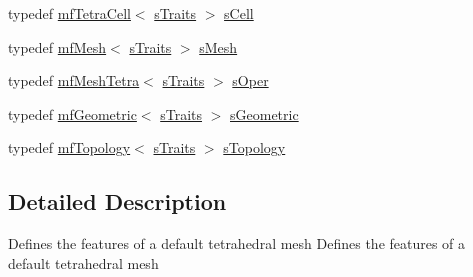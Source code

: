 \begin{DoxyCompactItemize}
\item 
typedef \hyperlink{classmf_1_1mfTetraCell}{mfTetraCell}$<$ \hyperlink{structmf_1_1mfDefaultTetrahedra}{sTraits} $>$ \hyperlink{structmf_1_1mfDefaultTetrahedra_a291c0a2bf137a9e8264e2b89a499ba27}{sCell}
\item 
typedef \hyperlink{classmf_1_1mfMesh}{mfMesh}$<$ \hyperlink{structmf_1_1mfDefaultTetrahedra}{sTraits} $>$ \hyperlink{structmf_1_1mfDefaultTetrahedra_a6a5c8bc495534e4ad55a1e83e158bb44}{sMesh}
\item 
typedef \hyperlink{classmf_1_1mfMeshTetra}{mfMeshTetra}$<$ \hyperlink{structmf_1_1mfDefaultTetrahedra}{sTraits} $>$ \hyperlink{structmf_1_1mfDefaultTetrahedra_ad70fcf2921fe011a2d0a855a0618d27b}{sOper}
\item 
typedef \hyperlink{classmf_1_1mfGeometric}{mfGeometric}$<$ \hyperlink{structmf_1_1mfDefaultTetrahedra}{sTraits} $>$ \hyperlink{structmf_1_1mfDefaultTetrahedra_a4c97ceeb083d1e8d83b8e76f789eae12}{sGeometric}
\item 
typedef \hyperlink{classmf_1_1mfTopology}{mfTopology}$<$ \hyperlink{structmf_1_1mfDefaultTetrahedra}{sTraits} $>$ \hyperlink{structmf_1_1mfDefaultTetrahedra_a647cca5ae85b55b22c9e503d4be1d0e6}{sTopology}
\end{DoxyCompactItemize}


\subsection{Detailed Description}
Defines the features of a default tetrahedral mesh Defines the features of a default tetrahedral mesh 

